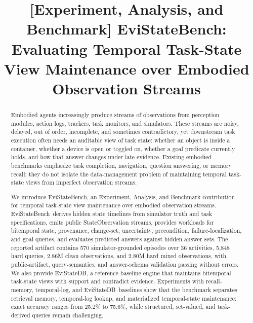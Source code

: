 \documentclass[conference]{IEEEtran}
\newcommand{\bench}{EviStateBench}
\newcommand{\engine}{EviStateDB}
\begin{document}
\title{[Experiment, Analysis, and Benchmark] EviStateBench: Evaluating Temporal Task-State View Maintenance over Embodied Observation Streams}

\author{
}

\maketitle

\begin{abstract}
Embodied agents increasingly produce streams of observations from perception modules, action logs, trackers, task monitors, and simulators. These streams are noisy, delayed, out of order, incomplete, and sometimes contradictory, yet downstream task execution often needs an auditable view of task state: whether an object is inside a container, whether a device is open or toggled on, whether a goal predicate currently holds, and how that answer changes under late evidence. Existing embodied benchmarks emphasize task completion, navigation, question answering, or memory recall; they do not isolate the data-management problem of maintaining temporal task-state views from imperfect observation streams.

We introduce \bench, an Experiment, Analysis, and Benchmark contribution for temporal task-state view maintenance over embodied observation streams. \bench\ derives hidden state timelines from simulator truth and task specifications, emits public StateObservation streams, provides workloads for bitemporal state, provenance, change-set, uncertainty, precondition, failure-localization, and goal queries, and evaluates predicted answers against hidden answer sets. The reported artifact contains 570 simulator-grounded episodes over 36 activities, 5,848 hard queries, 2.86M clean observations, and 2.80M hard mixed observations, with public-artifact, query-semantics, and answer-schema validation passing without errors. We also provide \engine, a reference baseline engine that maintains bitemporal task-state views with support and contradict evidence. Experiments with recall-memory, temporal-log, and \engine\ baselines show that the benchmark separates retrieval memory, temporal-log lookup, and materialized temporal-state maintenance: exact accuracy ranges from 25.2\% to 75.6\%, while structured, set-valued, and task-derived queries remain challenging.
\end{abstract}
\end{document}
